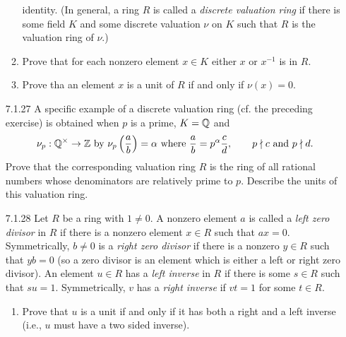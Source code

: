 \begin{enumerate}
\begin{enumerate}
                           identity. (In general, a ring $R$ is called a
                           \textit{discrete valuation ring} if there is some
                           field $K$ and some discrete valuation $\nu$ on $K$
                           such that $R$ is the valuation ring of $\nu$.)
                     \item Prove that for each nonzero element $x \in K$ either
                           $x$ or $x^{-1}$ is in $R$.
                     \item Prove tha an element $x$ is a unit of $R$ if and only
                           if $\nu(x) = 0$.
                  \end{enumerate}
   \item[7.1.27]  A specific example of a discrete valuation ring (cf. the
                  preceding exercise) is obtained when $p$ is a prime, $K = \mathbb{Q}$
                  and
                  $$\nu_p : \mathbb{Q}^\times \rightarrow \mathbb{Z} \text{ by }
                    \nu_p\left(\frac{a}{b}\right) = \alpha \text{ where }
                    \frac{a}{b} = p^\alpha\frac{c}{d}, \qquad p \nmid c
                    \text{ and } p \nmid d.$$
                  Prove that the corresponding valuation ring $R$ is the ring of
                  all rational numbers whose denominators are relatively prime
                  to $p$. Describe the units of this valuation ring.
   \item[7.1.28]  Let $R$ be a ring with $1 \neq 0$. A nonzero element $a$ is
                  called a \textit{left zero divisor} in $R$ if there is a
                  nonzero element $x \in R$ such that $ax = 0$. Symmetrically,
                  $b \neq 0$ is a \textit{right zero divisor} if there is a
                  nonzero $y \in R$ such that $yb = 0$ (so a zero divisor is an
                  element which is either a left or right zero divisor). An
                  element $u \in R$ has a \textit{left inverse} in $R$ if there
                  is some $s \in R$ such that $su = 1$. Symmetrically, $v$ has
                  a \textit{right inverse} if $vt = 1$ for some $t \in R$.
                  \begin{enumerate}
                     \item Prove that $u$ is a unit if and only if it has both a
                           right and a left inverse (i.e., $u$ must have a two
                           sided inverse).

\end{enumerate}
\end{enumerate}

